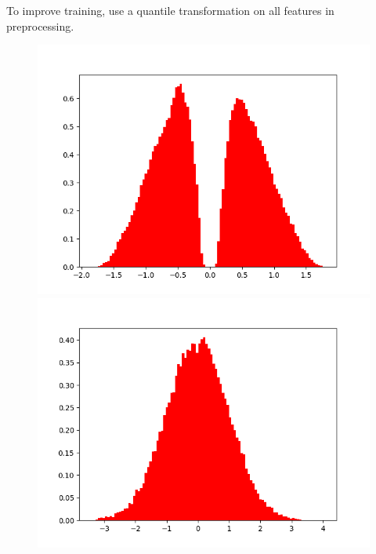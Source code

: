     To improve training, use a quantile transformation on all features in preprocessing. 
    
    \begin{figure}[H]
        \centering
        \begin{minipage}{.3\textwidth}
        
            \centering
            \includegraphics[width=.99\textwidth,trim={3cm 0 0 0},clip]{Chapters/Ch3-Simulations/normalizing_flows/pics/MeetingFigures/Bobby/QT/feature0_noQT.png}
            \includegraphics[width=.99\textwidth,trim={3cm 0 0 0},clip]{Chapters/Ch3-Simulations/normalizing_flows/pics/MeetingFigures/Bobby/QT/feature0.png}
    

\end{minipage}
\end{figure}
